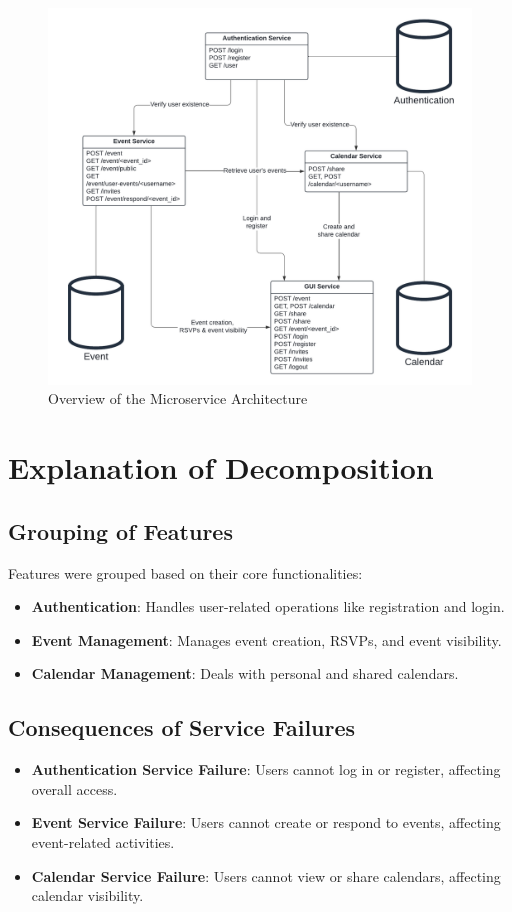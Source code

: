 \documentclass{article}
\begin{document}
\begin{figure}[h!]
    \centering
    \includegraphics[width=\textwidth]{Microservices.png}
    \caption{Overview of the Microservice Architecture}
    \label{fig:architecture}
\end{figure}

\section{Explanation of Decomposition}
\subsection{Grouping of Features}
Features were grouped based on their core functionalities:
\begin{itemize}
    \item \textbf{Authentication}: Handles user-related operations like registration and login.
    \item \textbf{Event Management}: Manages event creation, RSVPs, and event visibility.
    \item \textbf{Calendar Management}: Deals with personal and shared calendars.
\end{itemize}

\subsection{Consequences of Service Failures}
\begin{itemize}
    \item \textbf{Authentication Service Failure}: Users cannot log in or register, affecting overall access.
    \item \textbf{Event Service Failure}: Users cannot create or respond to events, affecting event-related activities.
    \item \textbf{Calendar Service Failure}: Users cannot view or share calendars, affecting calendar visibility.
\end{itemize}
\end{document}

